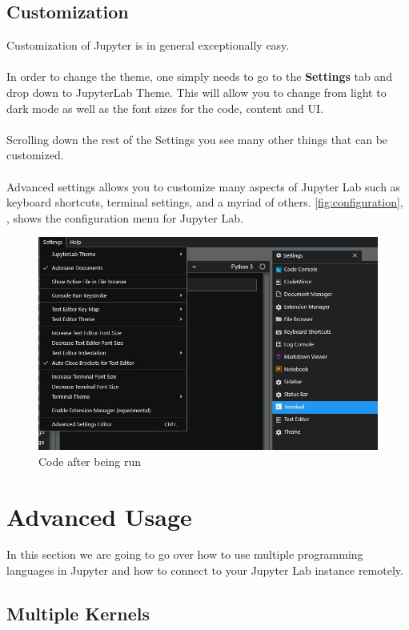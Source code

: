 \documentclass[pdftex,12pt]{artikel3}
\newcommand{\tabfigref}[1]{\autoref{#1}, \nameref{#1},}
\begin{document}
\subsection{Customization}
Customization of Jupyter is in general exceptionally easy.\\
\\
In order to change the theme, one simply needs to go to the \textbf{Settings} tab and drop down to JupyterLab Theme. This will allow you to change from light to dark mode as well as the font sizes for the code, content and UI.\\
\\
Scrolling down the rest of the Settings you see many other things that can be customized.\\
\\
Advanced settings allows you to customize many aspects of Jupyter Lab such as keyboard shortcuts, terminal settings, and a myriad of others. \tabfigref{fig:configuration} shows the configuration menu for Jupyter Lab.

\begin{figure}[h!]
    \centering
    \includegraphics[width=15cm]{settings.jpg}
    \caption{Code after being run}
    \label{fig:configuration}
\end{figure}

\section{Advanced Usage}

In this section we are going to go over how to use multiple programming languages in Jupyter and how to connect to your Jupyter Lab instance remotely.

\subsection{Multiple Kernels}
\end{document}
